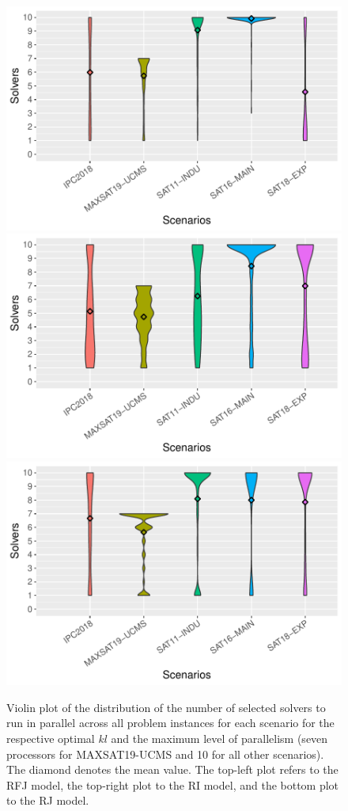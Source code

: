 \begin{table}
\begin{center}
\begin{tabular}{clcccc}
    \bottomrule
    
    \end{tabular}    
\end{center}
\end{table}

\begin{figure}
    \includegraphics[width=0.5\linewidth]{plots/number_of_solvers_rf_kl.pdf}
    \includegraphics[width=0.5\linewidth]{plots/number_of_solvers_infjack_kl.pdf}
    \includegraphics[width=0.5\linewidth]{plots/number_of_solvers_jack_kl.pdf}

    \caption[Distribution of Number of Selected Solvers when Using $AS_{kl}$]{
    Violin plot of the distribution of the number of selected solvers to run in parallel across all problem instances for each scenario for the respective optimal $kl$ and the maximum level of parallelism (seven processors for MAXSAT19-UCMS and 10 for all other scenarios). The diamond denotes the mean value. The top-left plot refers to the RFJ model, the top-right plot to the RI model, and the bottom plot to the RJ model.
    }
    \label{fig:numberofsolvers_kl}
\end{figure}


